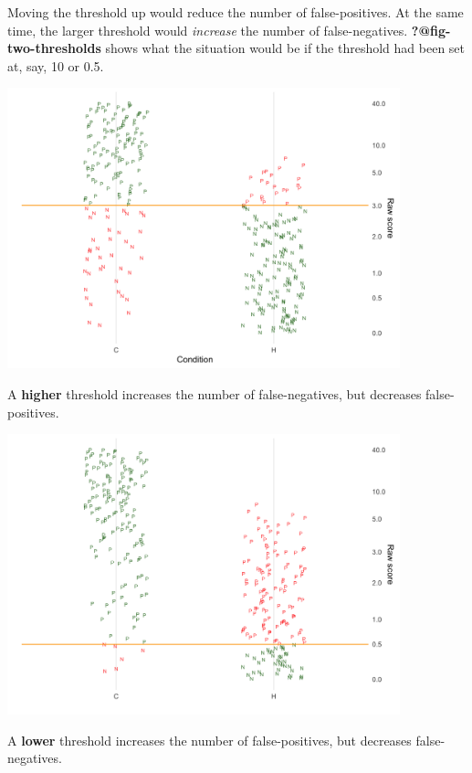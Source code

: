 \documentclass[
  letterpaper,
  DIV=11,
  numbers=noendperiod,
  oneside]{scrreprt}
\begin{document}
Moving the threshold up would reduce the number of false-positives. At
the same time, the larger threshold would \emph{increase} the number of
false-negatives. \textbf{?@fig-two-thresholds} shows what the situation
would be if the threshold had been set at, say, 10 or 0.5.

\begin{marginfigure}

{\centering \includegraphics[width=4.48in,height=\textheight]{./www/PN-threshold1.png}

}

\caption{\label{fig-two-thresholds1}A \textbf{higher} threshold
increases the number of false-negatives, but decreases false-positives.}

\end{marginfigure}

\begin{marginfigure}

{\centering \includegraphics[width=4.48in,height=\textheight]{./www/PN-threshold3.png}

}

\caption{\label{fig-two-thresholds2}A \textbf{lower} threshold increases
the number of false-positives, but decreases false-negatives.}

\end{marginfigure}
\end{document}
